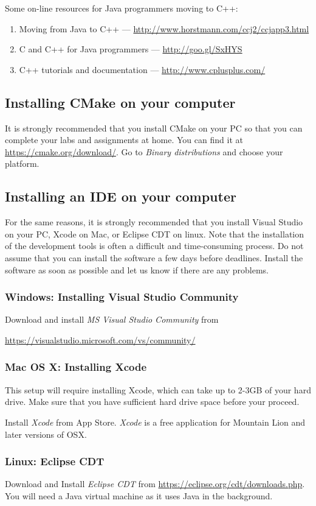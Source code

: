 Some on-line resources for Java programmers moving to C++:
\begin{enumerate}
 \item Moving from Java to C++ --- \url{http://www.horstmann.com/ccj2/ccjapp3.html}
 \item C and C++ for Java programmers --- \url{http://goo.gl/SxHYS}
 \item C++ tutorials and documentation --- \url{http://www.cplusplus.com/}
\end{enumerate}

\subsection*{Installing CMake on your computer}

It is strongly recommended that you install CMake on your PC so that you can complete your labs and assignments at home. 
You can find it at \url{https://cmake.org/download/}. Go to \emph{Binary distributions} and choose your platform. 


\subsection*{Installing an IDE on your computer}

For the same reasons, it is strongly recommended that you install Visual Studio on
your PC, Xcode on Mac, or Eclipse CDT on linux. 
Note that
the installation of the development tools is often a difficult and
time-consuming process. Do not assume that you can install the
software a few days before deadlines. Install the software as soon
as possible and let us know if there are any problems.

\subsubsection*{Windows: Installing Visual Studio Community}

Download and install \emph{MS Visual Studio Community} from
    
    \url{https://visualstudio.microsoft.com/vs/community/}


\subsubsection*{Mac OS X: Installing Xcode}
\label{sec:install-from-package}

This setup will require installing Xcode, which can
take up to 2-3GB of your hard drive. Make sure that you have
sufficient hard drive space before your proceed.

 Install \emph{Xcode} from App Store. \emph{Xcode} is a free
  application for Mountain Lion and later versions of OSX.
      


\subsubsection*{Linux: Eclipse CDT}

 Download and Install \emph{Eclipse CDT} from \url{https://eclipse.org/cdt/downloads.php}. You will need a Java virtual machine as it uses Java in the background.

